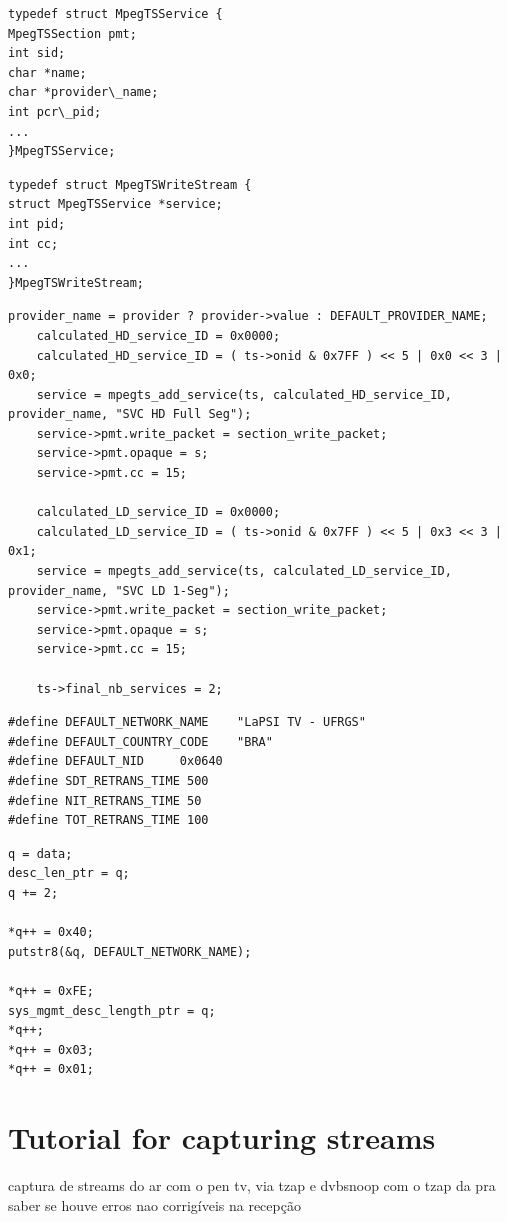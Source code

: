 \documentclass[
	12pt,				%
	openright,			%
	twoside,			%
	a4paper,			%
	brazil,
	french,				%
	english
	]{abntex2}
\begin{document}
\begin{apendicesenv}
\begin{lstlisting}[caption={Excerpt of MpegTSService structure}, label=lst_MpegTSService]
typedef struct MpegTSService {
MpegTSSection pmt; 
int sid; 
char *name;
char *provider\_name;
int pcr\_pid;
...
}MpegTSService;
\end{lstlisting}

\begin{lstlisting}[caption={Excerpt of MpegTSWriteStream structure}, label=lst_MpegTSWriteStream]
typedef struct MpegTSWriteStream {
struct MpegTSService *service;
int pid;
int cc;
...
}MpegTSWriteStream;
\end{lstlisting}

\begin{lstlisting}[caption={}, label=[]
    provider_name = provider ? provider->value : DEFAULT_PROVIDER_NAME;
	calculated_HD_service_ID = 0x0000;
	calculated_HD_service_ID = ( ts->onid & 0x7FF ) << 5 | 0x0 << 3 | 0x0;
	service = mpegts_add_service(ts, calculated_HD_service_ID, provider_name, "SVC HD Full Seg");
	service->pmt.write_packet = section_write_packet;
	service->pmt.opaque = s;
	service->pmt.cc = 15;

	calculated_LD_service_ID = 0x0000;
	calculated_LD_service_ID = ( ts->onid & 0x7FF ) << 5 | 0x3 << 3 | 0x1;
	service = mpegts_add_service(ts, calculated_LD_service_ID, provider_name, "SVC LD 1-Seg");
	service->pmt.write_packet = section_write_packet;
	service->pmt.opaque = s;
	service->pmt.cc = 15;
	
	ts->final_nb_services = 2;
\end{lstlisting}

\begin{lstlisting}[caption={Created macros.}, label={lst_macros}]
#define DEFAULT_NETWORK_NAME    "LaPSI TV - UFRGS"
#define DEFAULT_COUNTRY_CODE    "BRA"
#define DEFAULT_NID		0x0640
#define SDT_RETRANS_TIME 500
#define NIT_RETRANS_TIME 50
#define TOT_RETRANS_TIME 100
\end{lstlisting}

\begin{lstlisting}[caption={.}, label={lst_pointer_assignment}]
q = data;
desc_len_ptr = q;
q += 2;

*q++ = 0x40;
putstr8(&q, DEFAULT_NETWORK_NAME);

*q++ = 0xFE;
sys_mgmt_desc_length_ptr = q;
*q++;
*q++ = 0x03;
*q++ = 0x01;
\end{lstlisting}

\chapter{Tutorial for capturing streams}

captura de streams do ar com o pen tv, via tzap e dvbsnoop
	com o tzap da pra saber se houve erros nao corrigíveis na recepção


\end{apendicesenv}
\end{document}
